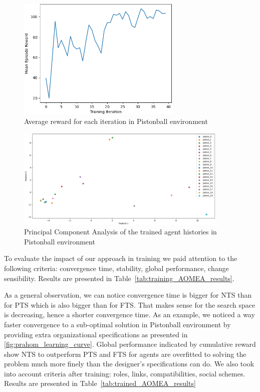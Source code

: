 \documentclass[runningheads]{llncs}
\begin{document}
\begin{figure}[h!]
    \centering
    \includegraphics[width=0.7\textwidth]{figures/prahom_learning_curve.png}
    \caption{Average reward for each iteration in Pistonball environment}
    \label{fig:prahom_learning_curve}
\end{figure}

\begin{figure}[h!]
    \centering
    \includegraphics[width=0.9\textwidth]{figures/prahom_pca_analysis.png}
    \caption{Principal Component Analysis of the trained agent histories in Pistonball environment}
    \label{fig:prahom_pca_analysis}
\end{figure}

To evaluate the impact of our approach in training we paid attention to the following criteria: convergence time, stability, global performance, change sensibility. Results are presented in Table~\ref{tab:training_AOMEA_results}.



As a general observation, we can notice convergence time is bigger for NTS than for PTS which is also bigger than for FTS. That makes sense for the search space is decreasing, hence a shorter convergence time. As an example, we noticed a way faster convergence to a sub-optimal solution in Pistonball environment by providing extra organizational specifications as presented in \autoref{fig:prahom_learning_curve}. Global performance indicated by cumulative reward show NTS to outperform PTS and FTS for agents are overfitted to solving the problem much more finely than the designer's specifications can do.
We also took into account criteria after training: roles, links, compatibilities, social schemes. Results are presented in Table~\ref{tab:trained_AOMEA_results}
\end{document}

